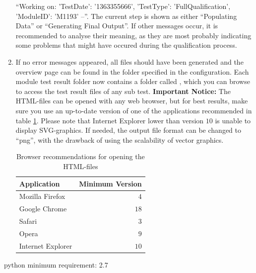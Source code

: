 \documentclass[0_Bericht]{subfiles}
\begin{document}
\begin{enumerate}
					``Working on:  {'TestDate': '1363355666', 'TestType': 'FullQualification', 'ModuleID': 'M1193'} --''. The current step is shown as either ``Populating Data'' or ``Generating Final Output''. If other messages occur, it is recommended to analyse their meaning, as they are most probably indicating some problems that might have occured during the qualification process.
 					\item If no error messages appeared, all files should have been generated and the overview page can be found in the folder specified in the configuration. Each module test result folder now contains a folder called , which you can browse to access the test result files of any sub test. \textbf{Important Notice:} The HTML-files can be opened with any web browser, but for best results, make sure you use an up-to-date version of one of the applications recommended in table \ref{tab:BrowserRecommendations}. Please note that Internet Explorer lower than version $10$ is unable to display SVG-graphics. If needed, the output file format can be changed to ``png'', with the drawback of using the scalability of vector graphics.
 					\begin{table}[h]
						\centering
						\begin{tabular}[c]{l|r}
							Application	& Minimum Version\\
							\hline
							Mozilla Firefox 	& $4$ \\
							Google Chrome 	&  $18$ \\
							Safari 		& $3$ \\
							Opera 		&  $9$ \\
							Internet Explorer 	&  $10$ \\
						\end{tabular}
						\label{tab:BrowserRecommendations}
						\caption{Browser recommendations for opening the HTML-files}
					\end{table}
				\end{enumerate}
				
				
				python minimum requirement: 2.7
				
				
\end{document}
